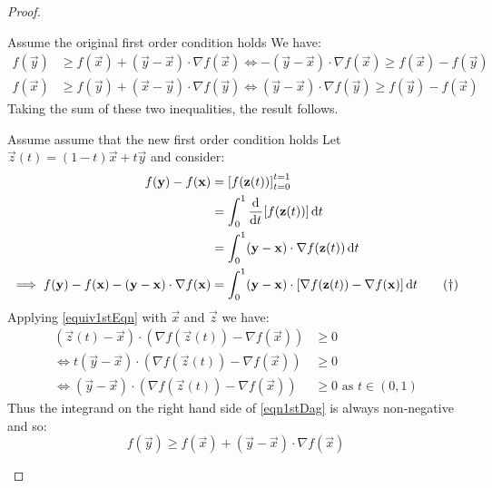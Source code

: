 \documentclass[../main.tex]{subfiles}
\begin{document}
\begin{proof}
  \begin{proofdirection}{Assume the original first order condition holds}
    We have:
    \begin{align*}
      f(\vec{y}) &\geq f(\vec{x}) + (\vec{y} - \vec{x}) \cdot \nabla f(\vec{x}) \iff -(\vec{y} - \vec{x}) \cdot \nabla f(\vec{x}) \geq f(\vec{x}) - f(\vec{y}) \\
      f(\vec{x}) &\geq f(\vec{y}) + (\vec{x} - \vec{y}) \cdot \nabla f(\vec{y}) \iff (\vec{y} - \vec{x}) \cdot \nabla f(\vec{y}) \geq f(\vec{y}) - f(\vec{x})
    \end{align*}
    Taking the sum of these two inequalities, the result follows.
  \end{proofdirection}
  \begin{proofdirection}{Assume assume that the new first order condition holds}
    Let $\vec{z}(t) = (1 - t)\vec{x} + t\vec{y}$ and consider:
    \begin{align}
      f(\vec{y}) - f(\vec{x}) &= \eval{f(\vec{z}(t))}{t = 0}{t = 1} \nonumber \\
                              &= \int_{0}^{1} \deriv{}{t}[f(\vec{z}(t))] \d{t} \nonumber \\
                              &= \int_{0}^{1} (\vec{y} - \vec{x}) \cdot \nabla f(\vec{z}(t)) \d{t} \nonumber \\
      \implies f(\vec{y}) - f(\vec{x}) - (\vec{y} - \vec{x}) \cdot \nabla f(\vec{x}) &= \int_{0}^{1} (\vec{y} - \vec{x}) \cdot [\nabla f(\vec{z}(t)) - \nabla f(\vec{x})] \d{t} \tag{$\dag$} \label{eqn1stDag}
    \end{align}
    Applying \cref{equiv1stEqn} with $\vec{x}$ and $\vec{z}$ we have:
    \begin{align*}
      (\vec{z}(t) - \vec{x}) \cdot (\nabla f(\vec{z}(t)) - \nabla f(\vec{x})) &\geq 0 \\
      \iff t(\vec{y} - \vec{x}) \cdot (\nabla f(\vec{z}(t)) - \nabla f(\vec{x})) &\geq 0 \\
      \iff (\vec{y} - \vec{x}) \cdot (\nabla f(\vec{z}(t)) - \nabla f(\vec{x})) &\geq 0 \text{ as $t \in (0, 1)$}
    \end{align*}
    Thus the integrand on the right hand side of \cref{eqn1stDag} is always non-negative and so:
    \[
      f(\vec{y}) \geq f(\vec{x}) + (\vec{y} - \vec{x}) \cdot \nabla f(\vec{x})
    \]
  \end{proofdirection}
\end{proof}
\end{document}
